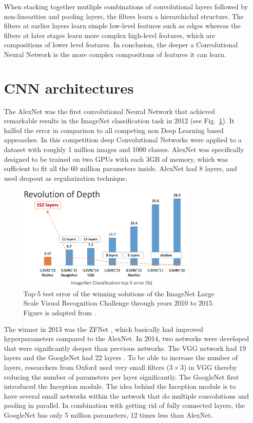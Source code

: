 When stacking together mutliple combinations of convolutional layers followed by non-linearities and pooling layers, the filters learn a hierarchichal structure. The filters at earlier layers learn simple low-level features such as edges whereas the filters at later stages learn more complex high-level features, which are compositions of lower level features. In conclusion, the deeper a Convolutional Neural Network is the more complex compositions of features it can learn.

\section{CNN architectures}\label{sec:CNNArchitectures}
The AlexNet was the first convolutional Neural Network that achieved remarkable results in the ImageNet classification task in 2012 (see Fig.~\ref{fig:imagenet}). It halfed the error in comparison to all competing non Deep Learning based approaches. In this competition deep Convolutional Networks were applied to a dataset with roughly 1 million images and 1000 classes. AlexNet was specifically designed to be trained on two GPUs with each 3GB of memory, which was sufficient to fit all the 60 million parameters inside. AlexNet had 8 layers, and used dropout as regularization technique.

\begin{figure}[h!]
	\centering
	\captionsetup{width=1\linewidth}
	\includegraphics[width=0.8\textwidth]{Figures/imagenet_evolution.png}
	\caption{Top-5 test error of the winning solutions of the ImageNet Large Scale Visual Recognition Challenge through years 2010 to 2015. Figure is adapted from \parencite{ilsvrc2015}.}
	\label{fig:imagenet}
\end{figure}

The winner in 2013 was the ZFNet \parencite{zeiler2013}, which basically had improved hyperparameters compared to the AlexNet. In 2014, two networks were developed that were significantly deeper than previous networks. The VGG network \parencite{simonyan2014} had 19 layers and the GoogleNet had 22 layers \parencite{szegedy2014}. To be able to increase the number of layers, researchers from Oxford used very small filters ($3\times3$) in VGG thereby reducing the number of parameters per layer significantly. The GoogleNet first introduced the Inception module. The idea behind the Inception module is to have several small networks within the network that do multiple convolutions and pooling in parallel. In combination with getting rid of fully connected layers, the GoogleNet has only 5 million parameters, 12 times less than AlexNet. 

